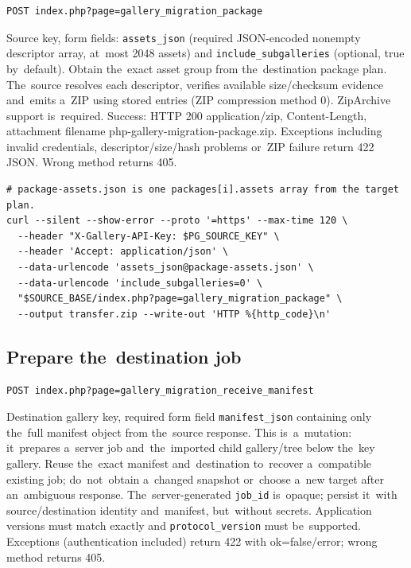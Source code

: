 \documentclass[11pt,a4paper]{article}
\newcommand{\codeword}[1]{\nolinkurl{#1}}
\begin{document}
\label{api352:migration-package}

\begin{lstlisting}[language={}]
POST index.php?page=gallery_migration_package
\end{lstlisting}

Source key, form fields: \codeword{assets_json} (required JSON-encoded nonempty descriptor
array, at~most 2048 assets) and \codeword{include_subgalleries} (optional, true by~default).
Obtain the~exact asset group from the~destination package plan. The~source resolves each
descriptor, verifies available size/checksum evidence and~emits a~ZIP using stored entries
(ZIP compression method 0). ZipArchive support is~required. Success: HTTP 200
application/zip, Content-Length, attachment filename php-gallery-migration-package.zip.
Exceptions including invalid credentials, descriptor/size/hash problems or~ZIP failure
return 422 JSON. Wrong method returns 405.

\begin{lstlisting}[language={}]
# package-assets.json is one packages[i].assets array from the target plan.
curl --silent --show-error --proto '=https' --max-time 120 \
  --header "X-Gallery-API-Key: $PG_SOURCE_KEY" \
  --header 'Accept: application/json' \
  --data-urlencode 'assets_json@package-assets.json' \
  --data-urlencode 'include_subgalleries=0' \
  "$SOURCE_BASE/index.php?page=gallery_migration_package" \
  --output transfer.zip --write-out 'HTTP %{http_code}\n'
\end{lstlisting}

\subsection{\texorpdfstring{Prepare the~destination job}{Prepare the destination job}}

\label{api352:migration-receive-manifest}

\begin{lstlisting}[language={}]
POST index.php?page=gallery_migration_receive_manifest
\end{lstlisting}

Destination gallery key, required form field \codeword{manifest_json} containing only
the~full manifest object from the~source response. This is~a~mutation: it~prepares a~server
job and~the~imported child gallery/tree below the~key gallery. Reuse the~exact manifest
and~destination to~recover a~compatible existing job; do~not~obtain a~changed snapshot
or~choose a~new target after an~ambiguous response. The~server-generated \codeword{job_id}
is~opaque; persist it~with source/destination identity and~manifest, but~without secrets.
Application versions must match exactly and \codeword{protocol_version} must be~supported.
Exceptions (authentication included) return 422 with ok=false/error; wrong method returns
405.
\end{document}
